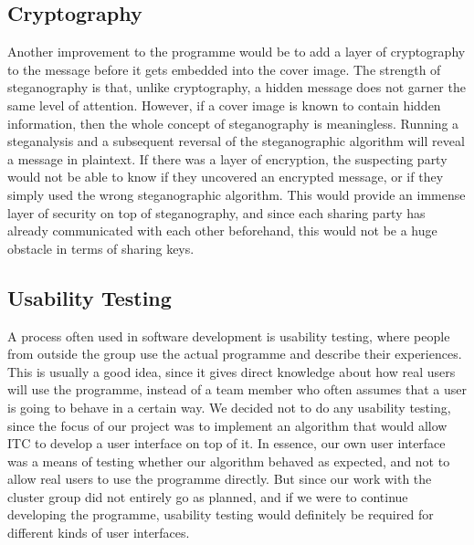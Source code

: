 \subsection*{Cryptography}
Another improvement to the programme would be to add a layer of cryptography to the message before it gets embedded into the cover image.
The strength of steganography is that, unlike cryptography, a hidden message does not garner the same level of attention.
However, if a cover image is known to contain hidden information, then the whole concept of steganography is meaningless.
Running a steganalysis and a subsequent reversal of the steganographic algorithm will reveal a message in plaintext.
If there was a layer of encryption, the suspecting party would not be able to know if they uncovered an encrypted message, or if they simply used the wrong steganographic algorithm.
This would provide an immense layer of security on top of steganography, and since each sharing party has already communicated with each other beforehand, this would not be a huge obstacle in terms of sharing keys.

\subsection*{Usability Testing}
A process often used in software development is usability testing, where people from outside the group use the actual programme and describe their experiences.
This is usually a good idea, since it gives direct knowledge about how real users will use the programme, instead of a team member who often assumes that a user is going to behave in a certain way.
We decided not to do any usability testing, since the focus of our project was to implement an algorithm that would allow ITC to develop a user interface on top of it.
In essence, our own user interface was a means of testing whether our algorithm behaved as expected, and not to allow real users to use the programme directly.
But since our work with the cluster group did not entirely go as planned, and if we were to continue developing the programme, usability testing would definitely be required for different kinds of user interfaces.
